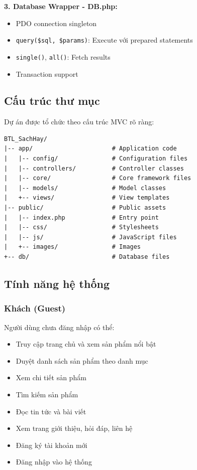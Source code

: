\textbf{3. Database Wrapper - DB.php:}
\begin{itemize}
    \item PDO connection singleton
    \item \texttt{query(\$sql, \$params)}: Execute với prepared statements
    \item \texttt{single()}, \texttt{all()}: Fetch results
    \item Transaction support
\end{itemize}


\subsection{Cấu trúc thư mục}

Dự án được tổ chức theo cấu trúc MVC rõ ràng:

\begin{verbatim}
BTL_SachHay/
|-- app/                      # Application code
|   |-- config/               # Configuration files
|   |-- controllers/          # Controller classes
|   |-- core/                 # Core framework files
|   |-- models/               # Model classes
|   +-- views/                # View templates
|-- public/                   # Public assets
|   |-- index.php             # Entry point
|   |-- css/                  # Stylesheets
|   |-- js/                   # JavaScript files
|   +-- images/               # Images
+-- db/                       # Database files
\end{verbatim}


\subsection{Tính năng hệ thống}

\subsubsection{Khách (Guest)}

Người dùng chưa đăng nhập có thể:
\begin{itemize}
    \item Truy cập trang chủ và xem sản phẩm nổi bật
    \item Duyệt danh sách sản phẩm theo danh mục
    \item Xem chi tiết sản phẩm
    \item Tìm kiếm sản phẩm
    \item Đọc tin tức và bài viết
    \item Xem trang giới thiệu, hỏi đáp, liên hệ
    \item Đăng ký tài khoản mới
    \item Đăng nhập vào hệ thống
\end{itemize}

